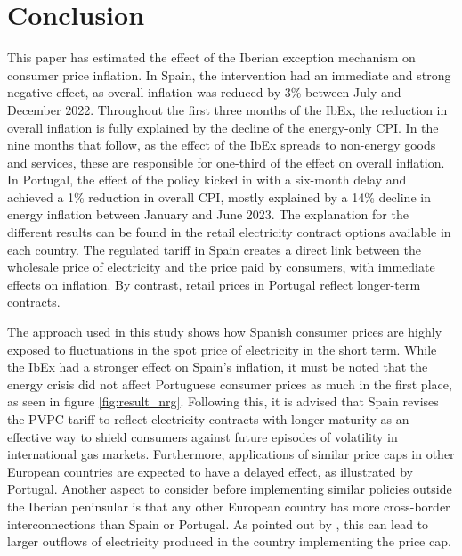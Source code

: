 \documentclass[12pt,a4paper]{article}
\begin{document}
\section{Conclusion}
This paper has estimated the effect of the Iberian exception mechanism on consumer price inflation. In Spain, the intervention had an immediate and strong negative effect, as overall inflation was reduced by 3\% between July and December 2022. Throughout the first three months of the IbEx, the reduction in overall inflation is fully explained by the decline of the energy-only CPI. In the nine months that follow, as the effect of the IbEx spreads to non-energy goods and services, these are responsible for one-third of the effect on overall inflation. In Portugal, the effect of the policy kicked in with a six-month delay and achieved a 1\% reduction in overall CPI, mostly explained by a 14\% decline in energy inflation between January and June 2023. The explanation for the different results can be found in the retail electricity contract options available in each country. The regulated tariff in Spain creates a direct link between the wholesale price of electricity and the price paid by consumers, with immediate effects on inflation. By contrast, retail prices in Portugal reflect longer-term contracts.\par
The approach used in this study shows how Spanish consumer prices are highly exposed to fluctuations in the spot price of electricity in the short term. While the IbEx had a stronger effect on Spain's inflation, it must be noted that the energy crisis did not affect Portuguese consumer prices as much in the first place, as seen in figure \ref{fig:result_nrg}. Following this, it is advised that Spain revises the PVPC tariff to reflect electricity contracts with longer maturity as an effective way to shield consumers against future episodes of volatility in international gas markets. Furthermore, applications of similar price caps in other European countries are expected to have a delayed effect, as illustrated by Portugal. Another aspect to consider before implementing similar policies outside the Iberian peninsular is that any other European country has more cross-border interconnections than Spain or Portugal. As pointed out by \textcite{schlecht2022}, this can lead to larger outflows of electricity produced in the country implementing the price cap.\par
\printbibliography

\newpage
\appendix
\end{document}
